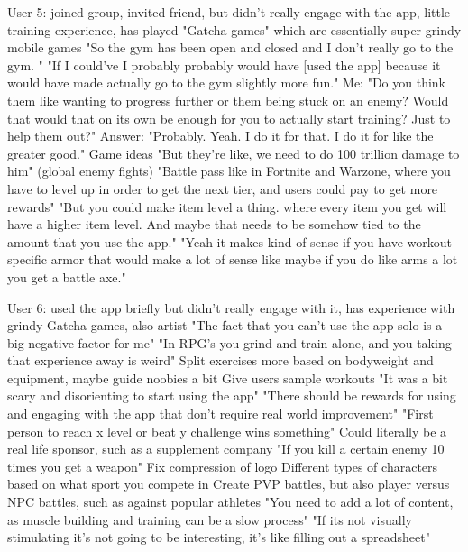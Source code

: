 \documentclass{l4proj}
\begin{document}
User 5: joined group, invited friend, but didn't really engage with the app, little training experience, has played "Gatcha games" which are essentially super grindy mobile games
 "So the gym has been open and closed and I don't really go to the gym. "
 "If I could've I probably probably would have [used the app] because it would have made actually go to the gym slightly more fun."
  Me: "Do you think them like wanting to progress further or them being stuck on an enemy? Would that would that on its own be enough for you to actually start training? Just to help them out?"
    Answer: "Probably. Yeah. I do it for that. I do it for like the greater good."
 Game ideas
   "But they're like, we need to do 100 trillion damage to him" (global enemy fights)
   "Battle pass like in Fortnite and Warzone, where you have to level up in order to get the next tier, and users could pay to get more rewards"
   "But you could make item level a thing. where every item you get will have a higher item level. And maybe that needs to be somehow tied to the amount that you use the app."
   "Yeah it makes kind of sense if you have workout specific armor that would make a lot of sense like maybe if you do like arms a lot you get a battle axe."

User 6: used the app briefly but didn't really engage with it, has experience with grindy Gatcha games, also artist
  "The fact that you can't use the app solo is a big negative factor for me"
  "In RPG's you grind and train alone, and you taking that experience away is weird"
  Split exercises more based on bodyweight and equipment, maybe guide noobies a bit
  Give users sample workouts
  "It was a bit scary and disorienting to start using the app"
  "There should be rewards for using and engaging with the app that don't require real world improvement"
    "First person to reach x level or beat y challenge wins something"
      Could literally be a real life sponsor, such as a supplement company
    "If you kill a certain enemy 10 times you get a weapon"
  Fix compression of logo
  Different types of characters based on what sport you compete in
  Create PVP battles, but also player versus NPC battles, such as against popular athletes
  "You need to add a lot of content, as muscle building and training can be a slow process"
  "If its not visually stimulating it's not going to be interesting, it's like filling out a spreadsheet"
\end{document}
